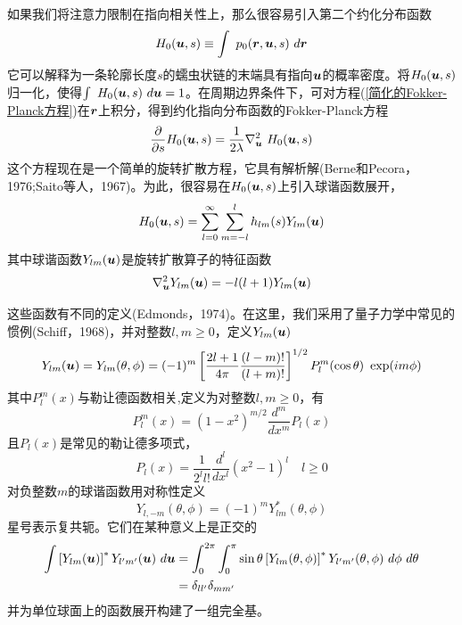 如果我们将注意力限制在指向相关性上，那么很容易引入第二个约化分布函数\\
\begin{equation}
	H_0(\bu,s)\equiv\int \ p_0(\br,\bu,s)\ d\br\label{第二个约化分布函数}
\end{equation}
它可以解释为一条轮廓长度$s$的蠕虫状链的末端具有指向$\bm{u}$的概率密度。将$H_0(\bm{u},s)$归一化，使得$\int \  H_0(\bu,s)\ d\bu=1$。在周期边界条件下，可对方程(\ref{简化的Fokker-Planck方程})在$\bm{r}$上积分，得到约化指向分布函数的Fokker-Planck方程\\
\begin{equation}
	\frac{\partial}{\partial s}H_0(\bu,s)=\frac{1}{2\lambda}\nabla_{\bu}^2\ H_0(\bu,s)\label{约化指向分布函数的Fokker-Planck方程}
\end{equation}
这个方程现在是一个简单的旋转扩散方程，它具有解析解(Berne和Pecora，1976;Saito等人，1967)。为此，很容易在$H_0(\bm{u},s)$上引入球谐函数展开，\\
\begin{equation}
	H_0(\bm{u},s)=\sum_{l=0}^{\infty}\sum_{m=-l}^{l}h_{lm}(s)Y_{lm}(\bm{u})\label{球谐函数展开}
\end{equation}
其中球谐函数$Y_{lm}(\bm{u})$是旋转扩散算子的特征函数
\begin{equation}
\nabla_{\bm{u}}^2Y_{lm}(\bm{u}) =-l(l+1)Y_{lm}(\bm{u})
\end{equation}

这些函数有不同的定义(Edmonds，1974)。在这里，我们采用了量子力学中常见的惯例(Schiff，1968)，并对整数$l,m\geq 0$，定义$Y_{lm}(\bm{u})$\\
\begin{equation}
Y_{lm}(\bm{u}) = Y_{lm}(\theta,\phi)=(-1)^m\left[\frac{2l+1}{4\pi}\frac{(l-m)!}{(l+m)!}\right]^{1/2}P_l^m(\cos \theta )\ \exp(im\phi)
\end{equation}
其中$P_l^m(x)$与勒让德函数相关,定义为对整数$l,m\geq 0$，有\\
\begin{equation}
P_l^m(x)=(1-x^2)^{m/2}\frac{d^m}{dx^m}P_l(x)
\end{equation}
且$P_l(x)$是常见的勒让德多项式，\\
\begin{equation}
P_l(x)=\frac{1}{2^ll!}\frac{d^l}{dx^l}(x^2-1)^l\quad l\geq 0
\end{equation}
对负整数$m$的球谐函数用对称性定义\\
\begin{equation}
Y_{l,-m}(\theta,\phi) =(-1)^m Y_{lm}^*(\theta,\phi)
\end{equation}
星号表示复共轭。它们在某种意义上是正交的\\
\begin{equation}
\begin{aligned}
\int  \left[Y_{lm}(\bu)\right]^*Y_{l'm'}(\bu)\ d\bu&=\int_{0}^{2\pi}\int_{0}^{\pi}\sin\theta\left[Y_{lm}(\theta,\phi)\right]^*Y_{l'm'}(\theta,\phi) \ d\phi\   d\theta\\&=\delta_{ll'}\delta_{mm'}
\end{aligned}
\end{equation}
并为单位球面上的函数展开构建了一组完全基。\\


